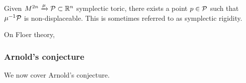 \begin{thm}
	Given $M^{2n}\xrightarrow\mu\mathcal{P}\subset\mathbb{R}^n$ symplectic toric, there exists a point $p\in\mathcal{P}$ such that $\mu^{-1}\mathcal{P}$ is non-displaceable.
	This is sometimes referred to as symplectic rigidity.
\end{thm}

\begin{remark}
    On Floer theory,
\end{remark}

\subsubsection*{Arnold's conjecture}

We now cover Arnold's conjecture.